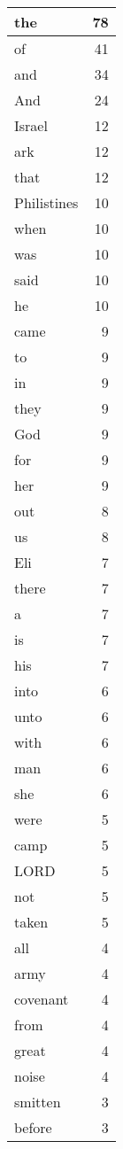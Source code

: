 \begin{center}
\begin{longtable}{l|r}
\hline \hline
\endlastfoot
the & 78 \\ \hline
of & 41 \\ \hline
and & 34 \\ \hline
And & 24 \\ \hline
Israel & 12 \\ \hline
ark & 12 \\ \hline
that & 12 \\ \hline
Philistines & 10 \\ \hline
when & 10 \\ \hline
was & 10 \\ \hline
said & 10 \\ \hline
he & 10 \\ \hline
came & 9 \\ \hline
to & 9 \\ \hline
in & 9 \\ \hline
they & 9 \\ \hline
God & 9 \\ \hline
for & 9 \\ \hline
her & 9 \\ \hline
out & 8 \\ \hline
us & 8 \\ \hline
Eli & 7 \\ \hline
there & 7 \\ \hline
a & 7 \\ \hline
is & 7 \\ \hline
his & 7 \\ \hline
into & 6 \\ \hline
unto & 6 \\ \hline
with & 6 \\ \hline
man & 6 \\ \hline
she & 6 \\ \hline
were & 5 \\ \hline
camp & 5 \\ \hline
LORD & 5 \\ \hline
not & 5 \\ \hline
taken & 5 \\ \hline
all & 4 \\ \hline
army & 4 \\ \hline
covenant & 4 \\ \hline
from & 4 \\ \hline
great & 4 \\ \hline
noise & 4 \\ \hline
smitten & 3 \\ \hline
before & 3 \\ \hline

\end{longtable}
\end{center}
